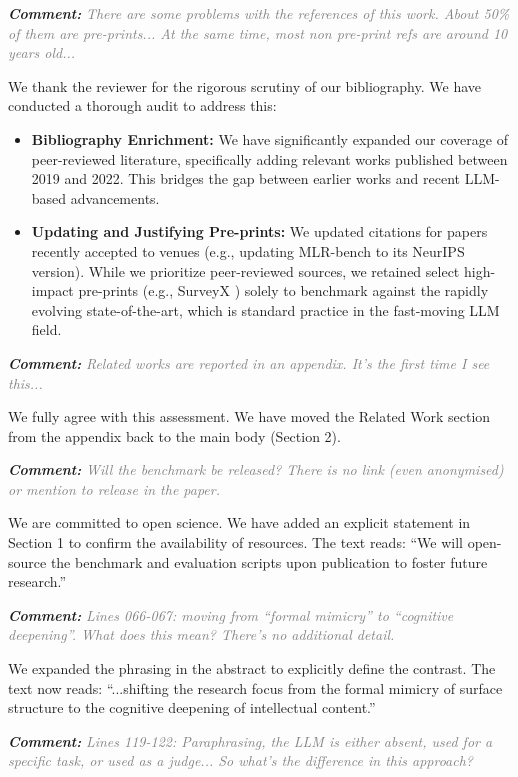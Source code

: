 \documentclass[11pt, a4paper]{article}
\newcommand{\comment}[1]{%
    \par\vspace{1em}%
    \noindent\textbf{\textit{Comment:}} \textit{\textcolor{gray}{#1}}%
}
\begin{document}
\comment{There are some problems with the references of this work. About 50\% of them are pre-prints... At the same time, most non pre-print refs are around 10 years old...}

We thank the reviewer for the rigorous scrutiny of our bibliography. We have conducted a thorough audit to address this:

\begin{itemize}
    \item \textbf{Bibliography Enrichment:} We have significantly expanded our coverage of peer-reviewed literature, specifically adding relevant works published between 2019 and 2022. This bridges the gap between earlier works and recent LLM-based advancements.
    \item \textbf{Updating and Justifying Pre-prints:} We updated citations for papers recently accepted to venues (e.g., updating MLR-bench \cite{chen2025mlrbench} to its NeurIPS version). While we prioritize peer-reviewed sources, we retained select high-impact pre-prints (e.g., SurveyX \cite{liang2025surveyx}) solely to benchmark against the rapidly evolving state-of-the-art, which is standard practice in the fast-moving LLM field.
\end{itemize}

\comment{Related works are reported in an appendix. It's the first time I see this...}

We fully agree with this assessment. We have moved the Related Work section from the appendix back to the main body (Section 2).

\comment{Will the benchmark be released? There is no link (even anonymised) or mention to release in the paper.}

We are committed to open science. We have added an explicit statement in Section 1 to confirm the availability of resources. The text reads: ``We will open-source the benchmark and evaluation scripts upon publication to foster future research.''

\comment{Lines 066-067: moving from ``formal mimicry'' to ``cognitive deepening''. What does this mean? There's no additional detail.}

We expanded the phrasing in the abstract to explicitly define the contrast. The text now reads: ``...shifting the research focus from the formal mimicry of surface structure to the cognitive deepening of intellectual content.''


\comment{Lines 119-122: Paraphrasing, the LLM is either absent, used for a specific task, or used as a judge... So what's the difference in this approach?}
\end{document}
